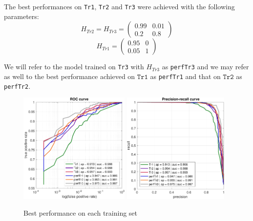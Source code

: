 \documentclass[a4paper]{article}
\begin{document}
            The best performances on \texttt{Tr1}, \texttt{Tr2} and \texttt{Tr3} were achieved with the following parameters:
            \[H_{Tr2}=H_{Tr3}=\begin{pmatrix}0.99&0.01\\0.2 & 0.8\end{pmatrix}\]
            \[H_{Tr1}=\begin{pmatrix} 0.95 & 0 \\ 0.05 & 1 \end{pmatrix}\]

                
            
            We will refer to the model trained on \texttt{Tr3} with $H_{Tr3}$ as \texttt{perfTr3} and we may refer as well to the best performance achieved on $\texttt{Tr1}$ as \texttt{perfTr1} and that on $\texttt{Tr2}$ as \texttt{perfTr2}.
            \begin{figure}[H]
                \centering
                \includegraphics[height=5.5cm]{exp1/perfXroc}
                \includegraphics[height=5.5cm]{exp1/perfXpr}
                \caption{Best performance on each training set\label{perfX}}
            \end{figure}
            
\end{document}

